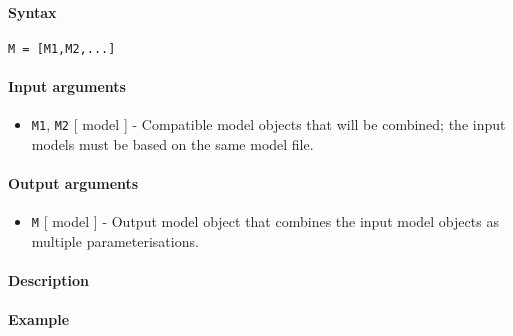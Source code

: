 


	\paragraph{Syntax}\label{syntax}

\begin{verbatim}
M = [M1,M2,...]
\end{verbatim}

\paragraph{Input arguments}\label{input-arguments}

\begin{itemize}
\itemsep1pt\parskip0pt
\item
  \texttt{M1}, \texttt{M2} {[} model {]} - Compatible model objects that
  will be combined; the input models must be based on the same model
  file.
\end{itemize}

\paragraph{Output arguments}\label{output-arguments}

\begin{itemize}
\itemsep1pt\parskip0pt
\item
  \texttt{M} {[} model {]} - Output model object that combines the input
  model objects as multiple parameterisations.
\end{itemize}

\paragraph{Description}\label{description}

\paragraph{Example}\label{example}


